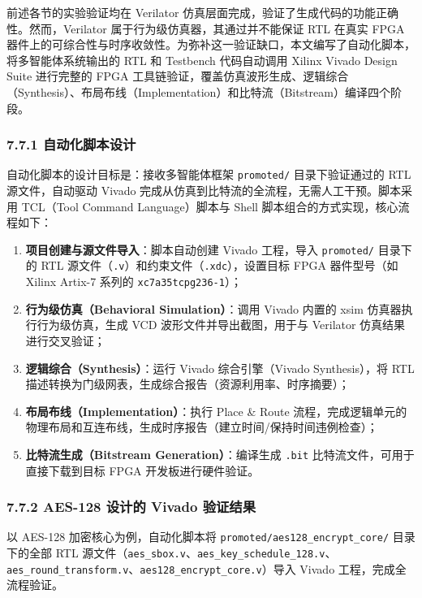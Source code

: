 前述各节的实验验证均在 Verilator 仿真层面完成，验证了生成代码的功能正确性。然而，Verilator
属于行为级仿真器，其通过并不能保证 RTL 在真实 FPGA
器件上的可综合性与时序收敛性。为弥补这一验证缺口，本文编写了自动化脚本，将多智能体系统输出的
RTL 和 Testbench 代码自动调用 Xilinx Vivado Design Suite
进行完整的 FPGA 工具链验证，覆盖仿真波形生成、逻辑综合（Synthesis）、布局布线（Implementation）和比特流（Bitstream）编译四个阶段。

\subsubsection{7.7.1 自动化脚本设计}

自动化脚本的设计目标是：接收多智能体框架 \texttt{promoted/}
目录下验证通过的 RTL 源文件，自动驱动 Vivado 完成从仿真到比特流的全流程，无需人工干预。脚本采用
TCL（Tool Command Language）脚本与 Shell 脚本组合的方式实现，核心流程如下：

\begin{enumerate}
\def\labelenumi{\arabic{enumi}.}
\tightlist
\item
  \textbf{项目创建与源文件导入}：脚本自动创建 Vivado 工程，导入
  \texttt{promoted/} 目录下的 RTL 源文件（\texttt{.v}）和约束文件（\texttt{.xdc}），设置目标
  FPGA 器件型号（如 Xilinx Artix-7 系列的 \texttt{xc7a35tcpg236-1}）；
\item
  \textbf{行为级仿真（Behavioral Simulation）}：调用 Vivado 内置的 xsim
  仿真器执行行为级仿真，生成 VCD 波形文件并导出截图，用于与 Verilator
  仿真结果进行交叉验证；
\item
  \textbf{逻辑综合（Synthesis）}：运行 Vivado 综合引擎（Vivado
  Synthesis），将 RTL 描述转换为门级网表，生成综合报告（资源利用率、时序摘要）；
\item
  \textbf{布局布线（Implementation）}：执行 Place \& Route
  流程，完成逻辑单元的物理布局和互连布线，生成时序报告（建立时间/保持时间违例检查）；
\item
  \textbf{比特流生成（Bitstream Generation）}：编译生成 \texttt{.bit}
  比特流文件，可用于直接下载到目标 FPGA 开发板进行硬件验证。
\end{enumerate}

\subsubsection{7.7.2 AES-128 设计的 Vivado 验证结果}

以 AES-128 加密核心为例，自动化脚本将
\texttt{promoted/aes128\_encrypt\_core/} 目录下的全部 RTL 源文件（\texttt{aes\_sbox.v}、\texttt{aes\_key\_schedule\_128.v}、\texttt{aes\_round\_transform.v}、\texttt{aes128\_encrypt\_core.v}）导入
Vivado 工程，完成全流程验证。

